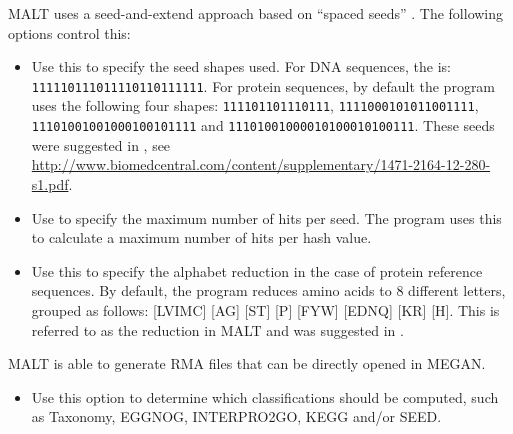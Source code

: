 \documentclass[11pt]{article}
\newcommand\MALT{{\sf MALT}\xspace}
\begin{document}
\MALT uses a seed-and-extend approach based on ``spaced seeds'' \cite{Burkhardt01,Ma02}. The following options control this:
\begin{itemize}
\setlength{\itemindent}{30pt}
\item[\itt{--shapes}]
{Use this to specify the seed shapes used. For DNA sequences, the  is:
{\tt 111110111011110110111111}.} 
For protein sequences, by default the program uses the following four shapes:
{\tt 111101101110111}, {\tt 1111000101011001111}, {\tt 11101001001000100101111} and {\tt 11101001000010100010100111}.
These seeds were suggested in \cite{Ilie:2011fk}, see \url{http://www.biomedcentral.com/content/supplementary/1471-2164-12-280-s1.pdf}.
\item[\itt{--maxHitsPerSeed}] Use to specify the maximum number of hits per seed. The program uses this
to calculate a maximum number of hits per hash value.
\item[\itt{--proteinReduct}] Use this to specify the alphabet reduction in the case of protein reference sequences.
By default, the program reduces amino acids to 8 different letters, grouped as follows:
[LVIMC] [AG] [ST] [P] [FYW] [EDNQ] [KR] [H]. This is referred to as the  reduction in \MALT and
was suggested in \cite{Murphy2000}.

\end{itemize}

MALT is able to generate RMA files that can be directly opened in MEGAN.
\begin{itemize}
\setlength{\itemindent}{30pt}
\item[\itt{--classify}] Use this option to determine which classifications should be computed, such as Taxonomy, EGGNOG, INTERPRO2GO, KEGG and/or SEED.
\end{itemize} 
\end{document}

